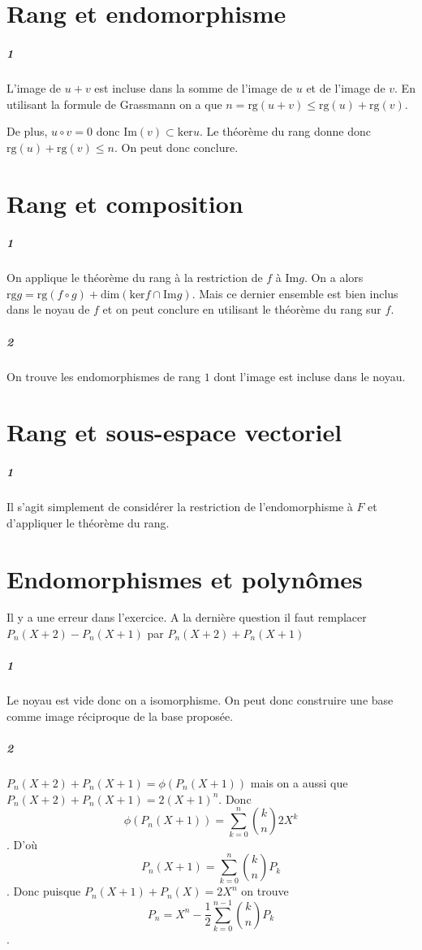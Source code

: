 \documentclass[10pt,a4paper]{article}
\begin{document}
\section{Rang et endomorphisme}
\subparagraph{1} L'image de $u+v$ est incluse dans la somme de l'image de $u$ et de l'image de $v$. En utilisant la formule de Grassmann on a que $n=\text{rg}(u+v) \le \text{rg}(u) +\text{rg}(v)$. 

De plus, $u \circ v=0$ donc $\text{Im}(v) \subset \text{ker}u$. Le théorème du rang donne donc $\text{rg}(u) +\text{rg}(v) \le n$. On peut donc conclure.

\section{Rang et composition}
\subparagraph{1}On applique le théorème du rang à la restriction de $f$ à $\text{Im}g$. On a alors $\text{rg}g= \text{rg}(f \circ g) + \text{dim} \left( \text{ker} f \cap \text{Im}g \right)$. Mais ce dernier ensemble est bien inclus dans le noyau de $f$ et on peut conclure en utilisant le théorème du rang sur $f$.
\subparagraph{2} On trouve les endomorphismes de rang $1$ dont l'image est incluse dans le noyau.

\section{Rang et sous-espace vectoriel}
\subparagraph{1}Il s'agit simplement de considérer la restriction de l'endomorphisme à $F$ et d'appliquer le théorème du rang.

\section{Endomorphismes et polynômes}
Il y a une erreur dans l'exercice. A la dernière question il faut remplacer $P_n(X+2)-P_n(X+1)$ par $P_n(X+2)+P_n(X+1)$
\subparagraph{1}Le noyau est vide donc on a isomorphisme. On peut donc construire une base comme image réciproque de la base proposée.
\subparagraph{2}$P_n(X+2)+P_n(X+1)=\phi(P_n(X+1))$ mais on a aussi que $P_n(X+2)+P_n(X+1)=2(X+1)^n$. Donc $$\phi(P_n(X+1))=\sum_{k=0}^n \binom{k}{n} 2X^k$$. D'où $$P_n(X+1)=\sum_{k=0}^n \binom{k}{n} P_k$$. Donc puisque $P_n(X+1)+P_n(X)=2X^n$ on trouve $$P_n = X^n - \frac{1}{2} \sum_{k=0}^{n-1} \binom{k}{n} P_k$$.
\end{document}
